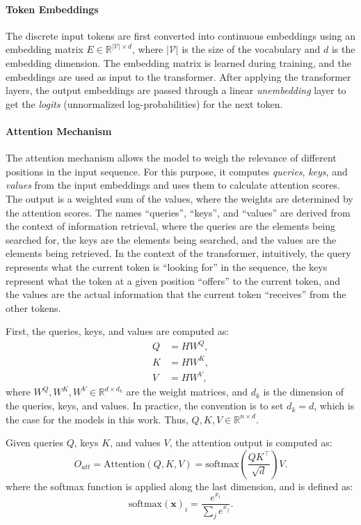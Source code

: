 \paragraph{Token Embeddings}
The discrete input tokens are first converted into continuous embeddings using an embedding matrix $E \in \mathbb{R}^{|\mathcal{V}| \times d}$, where $|\mathcal{V}|$ is the size of the vocabulary and $d$ is the embedding dimension. The embedding matrix is learned during training, and the embeddings are used as input to the transformer. After applying the transformer layers, the output embeddings are passed through a linear \emph{unembedding} layer to get the \emph{logits} (unnormalized log-probabilities) for the next token.

\paragraph{Attention Mechanism}
The attention mechanism \parencite{bahdanau_neural_2014} allows the model to weigh the relevance of different positions in the input sequence. For this purpose, it computes \emph{queries}, \emph{keys}, and \emph{values} from the input embeddings and uses them to calculate attention scores. The output is a weighted sum of the values, where the weights are determined by the attention scores. The names ``queries'', ``keys'', and ``values'' are derived from the context of information retrieval, where the queries are the elements being searched for, the keys are the elements being searched, and the values are the elements being retrieved. In the context of the transformer, intuitively, the query represents what the current token is ``looking for'' in the sequence, the keys represent what the token at a given position ``offers'' to the current token, and the values are the actual information that the current token ``receives'' from the other tokens.

First, the queries, keys, and values are computed as:
\begin{align*}
    Q & = H W^Q, \\
    K & = H W^K, \\
    V & = H W^V,
\end{align*}
where $W^Q, W^K, W^V \in \mathbb{R}^{d \times d_k}$ are the weight matrices, and $d_k$ is the dimension of the queries, keys, and values. In practice, the convention is to set $d_k = d$, which is the case for the models in this work. Thus, $Q, K, V \in \mathbb{R}^{n \times d}$.

Given queries $Q$, keys $K$, and values $V$, the attention output is computed as:
\begin{equation*}
    O_{att} = \text{Attention}(Q, K, V) = \text{softmax}\left( \frac{Q K^\top}{\sqrt{d}} \right) V.
\end{equation*}
where the softmax function is applied along the last dimension, and is defined as:
\begin{equation*}
    \text{softmax}(\mathbf{x})_i = \frac{e^{x_i}}{\sum_j e^{x_j}}.
\end{equation*}

